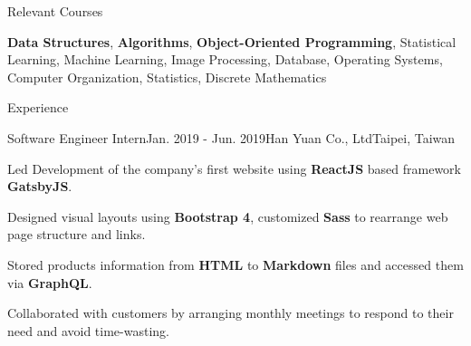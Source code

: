 \documentclass{resume} %
\begin{document}

\begin{rSection}{Relevant Courses}

\textbf{Data Structures}, 
\textbf{Algorithms}, 
\textbf{Object-Oriented Programming}, 
Statistical Learning, 
Machine Learning, 
Image Processing,
Database,
Operating Systems,
Computer Organization,
Statistics, 
Discrete Mathematics


\end{rSection}



\begin{rSection}{Experience}

\begin{rSubsection}{Software Engineer Intern}{Jan. 2019 - Jun. 2019}{Han Yuan Co., Ltd}{Taipei, Taiwan}
\item Led Development of the company's first website using \textbf{ReactJS} based framework \textbf{GatsbyJS}.
\item Designed visual layouts using \textbf{Bootstrap 4}, customized \textbf{Sass} to rearrange web page structure and links.
\item Stored products information from \textbf{HTML} to \textbf{Markdown} files and accessed them via \textbf{GraphQL}.
\item Collaborated with customers by arranging monthly meetings to respond to their need and avoid time-wasting.

\end{rSubsection}

\end{rSection}
\end{document}
